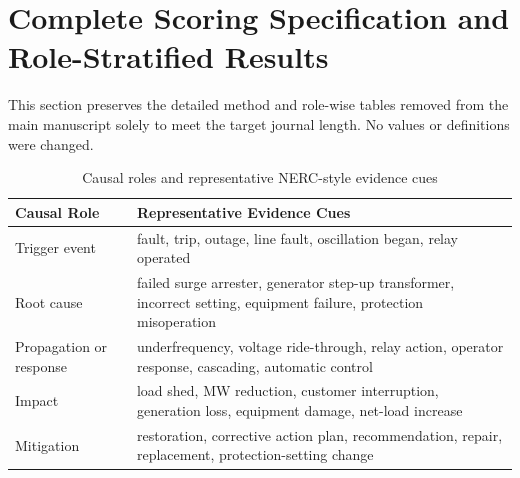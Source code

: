 \documentclass[11pt,letterpaper]{article}
\begin{document}
\section{Complete Scoring Specification and Role-Stratified Results}
\label{sec:s7}

This section preserves the detailed method and role-wise tables removed from the main manuscript solely to meet the target journal length. No values or definitions were changed.

\begin{table}[ht]
\centering
\small
\caption{Causal roles and representative NERC-style evidence cues}
\begin{tabular}{lp{11.5cm}}
\toprule
\textbf{Causal Role} & \textbf{Representative Evidence Cues} \\
\midrule
Trigger event & fault, trip, outage, line fault, oscillation began, relay operated \\
Root cause & failed surge arrester, generator step-up transformer, incorrect setting, equipment failure, protection misoperation \\
Propagation or response & underfrequency, voltage ride-through, relay action, operator response, cascading, automatic control \\
Impact & load shed, MW reduction, customer interruption, generation loss, equipment damage, net-load increase \\
Mitigation & restoration, corrective action plan, recommendation, repair, replacement, protection-setting change \\
\bottomrule
\end{tabular}
\end{table}
\end{document}
